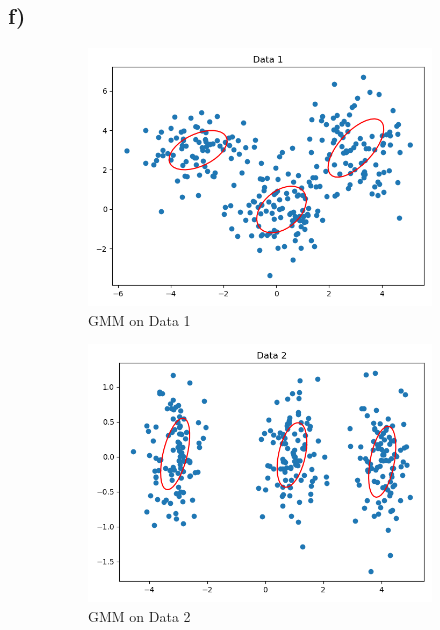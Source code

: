 \documentclass{scrartcl}
\begin{document}
	\subsection*{f)}
	\begin{figure}[h]
		\centering
		\begin{subfigure}[b]{0.3\textwidth}
			\centering
			\includegraphics[width=\textwidth]{images/data1}
			\caption{GMM on Data 1}
		\end{subfigure}
		\hfill
		\begin{subfigure}[b]{0.3\textwidth}
			\centering
			\includegraphics[width=\textwidth]{images/data2}
			\caption{GMM on Data 2}
		\end{subfigure}
		\hfill
		\begin{subfigure}[b]{0.3\textwidth}

\end{subfigure}
\end{figure}
\end{document}
